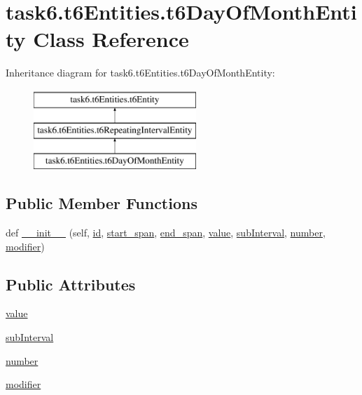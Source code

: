 \hypertarget{classtask6_1_1t6Entities_1_1t6DayOfMonthEntity}{}\section{task6.\+t6\+Entities.\+t6\+Day\+Of\+Month\+Entity Class Reference}
\label{classtask6_1_1t6Entities_1_1t6DayOfMonthEntity}
Inheritance diagram for task6.\+t6\+Entities.\+t6\+Day\+Of\+Month\+Entity\+:\begin{figure}[H]
\begin{center}
\leavevmode
\includegraphics[height=3.000000cm]{classtask6_1_1t6Entities_1_1t6DayOfMonthEntity}
\end{center}
\end{figure}
\subsection*{Public Member Functions}
\begin{DoxyCompactItemize}
\item 
def \hyperlink{classtask6_1_1t6Entities_1_1t6DayOfMonthEntity_a044a5e03aa1b971d1548f9ba7f4f8fb1}{\+\_\+\+\_\+init\+\_\+\+\_\+} (self, \hyperlink{classtask6_1_1t6Entities_1_1t6Entity_a96b2e7fb553c920ab2db6f6deb31e3b4}{id}, \hyperlink{classtask6_1_1t6Entities_1_1t6Entity_a8221c36d2995a24200cdfbd74cc9233c}{start\+\_\+span}, \hyperlink{classtask6_1_1t6Entities_1_1t6Entity_a597d42bb02fc9f42277098f0ce21917c}{end\+\_\+span}, \hyperlink{classtask6_1_1t6Entities_1_1t6DayOfMonthEntity_ac420029b0649e43b1ff883476f6fa10b}{value}, \hyperlink{classtask6_1_1t6Entities_1_1t6DayOfMonthEntity_a858565df8b18a9792e31878aa35c9201}{sub\+Interval}, \hyperlink{classtask6_1_1t6Entities_1_1t6DayOfMonthEntity_a7ff2e01a82a8f266873e329888d9bda0}{number}, \hyperlink{classtask6_1_1t6Entities_1_1t6DayOfMonthEntity_ad0de20da9431d59f74aeb4daa7f16b72}{modifier})
\end{DoxyCompactItemize}
\subsection*{Public Attributes}
\begin{DoxyCompactItemize}
\item 
\hyperlink{classtask6_1_1t6Entities_1_1t6DayOfMonthEntity_ac420029b0649e43b1ff883476f6fa10b}{value}
\item 
\hyperlink{classtask6_1_1t6Entities_1_1t6DayOfMonthEntity_a858565df8b18a9792e31878aa35c9201}{sub\+Interval}
\item 
\hyperlink{classtask6_1_1t6Entities_1_1t6DayOfMonthEntity_a7ff2e01a82a8f266873e329888d9bda0}{number}
\item 
\hyperlink{classtask6_1_1t6Entities_1_1t6DayOfMonthEntity_ad0de20da9431d59f74aeb4daa7f16b72}{modifier}
\end{DoxyCompactItemize}


